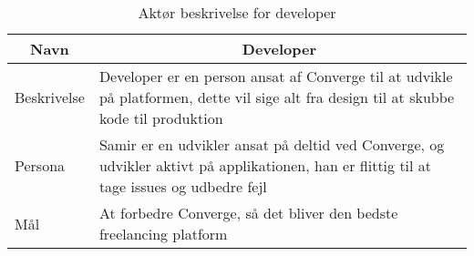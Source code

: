 \begin{table}[H]
    \begin{small}
        \caption{Aktør beskrivelse for developer}
        \label{tab:developer}
        \begin{center}
            \begin{tabular}[c]{l|l}
                \multicolumn{1}{c|}{\textbf{Navn}} & \multicolumn{1}{c}{\textbf{Developer}}                                                                                                                              \\
                \hline
                Beskrivelse                        & \multicolumn{1}{p{10cm}}{Developer er en person ansat af Converge til at udvikle på platformen, dette vil sige alt fra design til at skubbe kode til produktion}    \\
                \hline
                Persona                            & \multicolumn{1}{p{10cm}}{Samir er en udvikler ansat på deltid ved Converge, og udvikler aktivt på applikationen, han er flittig til at tage issues og udbedre fejl} \\
                \hline
                Mål                                & \multicolumn{1}{p{10cm}}{At forbedre Converge, så det bliver den bedste freelancing platform}                                                                       \\
            \end{tabular}
        \end{center}
    \end{small}
\end{table}

